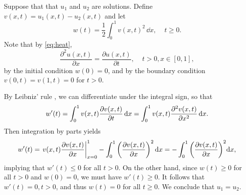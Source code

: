 Suppose that that $u_1$ and $u_2$ are solutions. Define $v(x,t)=u_1(x,t)-u_2(x,t)$ and let
\begin{equation*}
    w(t)=\frac{1}{2}\int_0^1v(x,t)^2\,\dd x,\;\;\;\; t\ge0.
\end{equation*}
Note that by \cref{eq:heat},
\begin{equation*}
    \frac{\partial^2 u(x,t)}{\partial x}= \frac{\partial u(x,t)}{\partial t},\;\;\;\;t>0,x\in[0,1],
\end{equation*}
by the initial condition $w(0)=0$, and by the boundary condition $v(0,t)=v(1,t)=0$ for $t>0$.

By Leibniz' rule \cite[8.11.2]{die69}, we can differentiate under the integral sign, so that
\begin{equation*}
    w'(t) = \int_0^1v(x,t)\pdv{v(x,t)}{t}\,\dd x = \int_0^1 v(x,t)\pdv[2]{v(x,t)}{x}\,\dd x.
\end{equation*}
Then integration by parts yields
\begin{equation*}
    w'(t) = \eval{v(x,t)\pdv{v(x,t)}{x}}_{x=0}^1 - \int_0^1\qty(\pdv{v(x,t)}{x})^2\,\dd x = -\int_0^1\qty(\pdv{v(x,t)}{x})^2\dd x,
\end{equation*}
implying that $w'(t)\le 0$ for all $t>0$. On the other hand, since $w(t)\ge0$ for all $t>0$ and $w(0)=0$, we must have $w'(t)\ge0$. It follows that $w'(t)=0, t>0$, and thus $w(t)=0$ for all $t\ge0$. We conclude that $u_1=u_2$.



